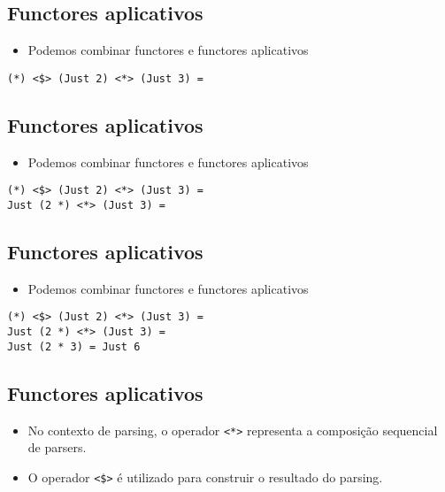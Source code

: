\documentclass[11pt]{article}
\begin{document}
\subsection*{Functores aplicativos}
\label{sec:org074a284}

\begin{itemize}
\item Podemos combinar functores e functores aplicativos
\end{itemize}

\begin{verbatim}
(*) <$> (Just 2) <*> (Just 3) =
\end{verbatim}
\subsection*{Functores aplicativos}
\label{sec:orgb95f9e0}

\begin{itemize}
\item Podemos combinar functores e functores aplicativos
\end{itemize}

\begin{verbatim}
(*) <$> (Just 2) <*> (Just 3) =
Just (2 *) <*> (Just 3) =
\end{verbatim}
\subsection*{Functores aplicativos}
\label{sec:org9f0a4ee}

\begin{itemize}
\item Podemos combinar functores e functores aplicativos
\end{itemize}

\begin{verbatim}
(*) <$> (Just 2) <*> (Just 3) =
Just (2 *) <*> (Just 3) =
Just (2 * 3) = Just 6
\end{verbatim}
\subsection*{Functores aplicativos}
\label{sec:orge951718}

\begin{itemize}
\item No contexto de parsing, o operador \texttt{<*>} representa a composição sequencial de parsers.

\item O operador \texttt{<\$>} é utilizado para construir o resultado do parsing.
\end{itemize}
\end{document}
